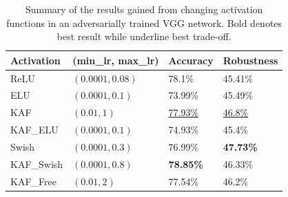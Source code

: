 \documentclass[LaM,binding=0.6cm]{./packages/sapthesis/sapthesis}
\begin{document}
        \begin{table}
            \centering
            \begin{tabular}{ |p{2.5cm}||p{3.5cm}|p{1.7cm}|p{2.1cm}|  }
                \hline
                \textbf{Activation} & \textbf{(min\_lr, max\_lr)} & \textbf{Accuracy} & \textbf{Robustness}\\
                \hline
                ReLU & $(0.0001, 0.08)$ & 78.1\% &  45.41\%\\
                ELU & $(0.0001, 0.1)$ &  73.99\% &45.49\%\\
                KAF & $(0.01, 1)$ & \underline{77.93\%}& \underline{46.8\%}\\
                KAF\_ELU & $(0.0001, 0.1)$ & 74.93\%& 45.4\%\\
                Swish & $(0.0001, 0.3)$ & 76.99\% & \textbf{47.73\%}\\
                KAF\_Swish & $(0.0001, 0.8)$ & \textbf{78.85\%}& 46.33\%\\
                KAF\_Free & $(0.01, 2)$ & 77.54\%& 46.2\%\\
                \hline
            \end{tabular}
            \caption{Summary of the results gained from changing activation functions in an 
            adversarially trained VGG network. Bold denotes best result while underline best trade-off.}
            \label{tab:vggrob}
        \end{table}
        
\end{document}
